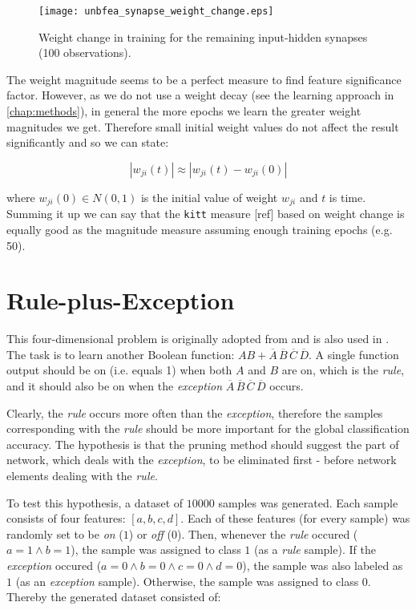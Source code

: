 \begin{figure}[H]
\centering
\texttt{[image: unbfea\_synapse\_weight\_change.eps]}
\caption{Weight change in training for the remaining input-hidden synapses (100 observations).}
\label{fig:examples:unbfea_synapse_weight_change}
\end{figure}

The weight magnitude seems to be a perfect measure to find feature significance factor. However, as we do not use a weight decay (see the learning approach in \cref{chap:methods}), in general the more epochs we learn the greater weight magnitudes we get. Therefore small initial weight values do not affect the result significantly and so we can state:

\begin{equation}
|w_{ji}(t)| \approx |w_{ji}(t) - w_{ji}(0)|
\end{equation}

where $ w_{ji}(0) \in N(0,1) $ is the initial value of weight $ w_{ji} $ and $ t $ is time. Summing it up we can say that the \texttt{kitt} measure [ref] based on weight change is equally good as the magnitude measure assuming enough training epochs (e.g. 50).

\section{Rule-plus-Exception} \label{sec:example_rpe}
This four-dimensional problem is originally adopted from \citep{mozer_smolensky} and is also used in \citep{karnin}. The task is to learn another Boolean function: $ AB+\overline{A} \, \overline{B} \, \overline{C} \, \overline{D} $. A single function output should be on (i.e. equals 1) when both $ A $ and $ B $ are on, which is the \textit{rule}, and it should also be on when the \textit{exception} $ \overline{A} \, \overline{B} \, \overline{C} \, \overline{D} $ occurs.

Clearly, the \textit{rule} occurs more often than the \textit{exception}, therefore the samples corresponding with the \textit{rule} should be more important for the global classification accuracy. The hypothesis is that the pruning method should suggest the part of network, which deals with the \textit{exception}, to be eliminated first - before network elements dealing with the \textit{rule}.

To test this hypothesis, a dataset of $ 10000 $ samples was generated. Each sample consists of four features: $ [a, b, c, d] $. Each of these features (for every sample) was randomly set to be \textit{on} ($ 1 $) or \textit{off} ($ 0 $). Then, whenever the \textit{rule} occured ($ a = 1 \wedge b = 1 $), the sample was assigned to class $ 1 $ (as a \textit{rule} sample). If the \textit{exception} occured ($ a = 0 \wedge b = 0 \wedge c = 0 \wedge d = 0 $), the sample was also labeled as $ 1 $ (as an \textit{exception} sample). Otherwise, the sample was assigned to class $ 0 $. Thereby the generated dataset consisted of:

